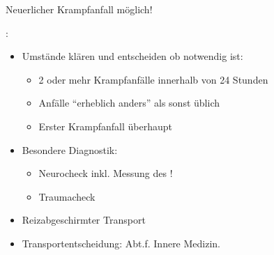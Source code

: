 
\label{m:zerebraler-krampfanfall-status-post}Neuerlicher Krampfanfall möglich!

: 
\begin{itemize}
  \item Umstände klären und entscheiden ob 
  notwendig ist:
  \begin{itemize}
    \item 2 oder mehr Krampfanfälle innerhalb von 24 Stunden
    \item Anfälle \enquote{erheblich anders} als sonst üblich
    \item Erster Krampfanfall überhaupt
  \end{itemize}
  \item Besondere Diagnostik:
  \begin{itemize}
    \item Neurocheck inkl. Messung des !
    \item Traumacheck
  \end{itemize}
  \item Reizabgeschirmter Transport
  \item Transportentscheidung: Abt.f. Innere Medizin.
\end{itemize}